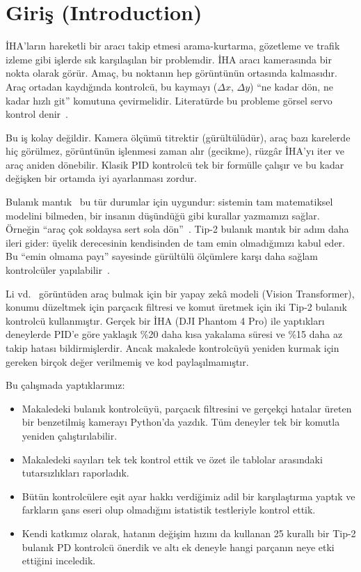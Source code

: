 \documentclass[conference,a4paper]{IEEEtran}
\begin{document}
\section{Giriş (Introduction)}
İHA'ların hareketli bir aracı takip etmesi arama-kurtarma, gözetleme ve trafik izleme gibi işlerde sık karşılaşılan bir problemdir. İHA aracı kamerasında bir nokta olarak görür. Amaç, bu noktanın hep görüntünün ortasında kalmasıdır. Araç ortadan kaydığında kontrolcü, bu kaymayı ($\Delta x$, $\Delta y$) ``ne kadar dön, ne kadar hızlı git'' komutuna çevirmelidir. Literatürde bu probleme görsel servo kontrol denir~\cite{chaumette2006}.

Bu iş kolay değildir. Kamera ölçümü titrektir (gürültülüdür), araç bazı karelerde hiç görülmez, görüntünün işlenmesi zaman alır (gecikme), rüzgâr İHA'yı iter ve araç aniden dönebilir. Klasik PID kontrolcü tek bir formülle çalışır ve bu kadar değişken bir ortamda iyi ayarlanması zordur.

Bulanık mantık~\cite{zadeh1965} bu tür durumlar için uygundur: sistemin tam matematiksel modelini bilmeden, bir insanın düşündüğü gibi kurallar yazmamızı sağlar. Örneğin ``araç çok soldaysa sert sola dön''~\cite{mamdani1975}. Tip-2 bulanık mantık bir adım daha ileri gider: üyelik derecesinin kendisinden de tam emin olmadığımızı kabul eder. Bu ``emin olmama payı'' sayesinde gürültülü ölçümlere karşı daha sağlam kontrolcüler yapılabilir~\cite{karnik1999,mendel2002,wu2012}.

Li vd.~\cite{li2024} görüntüden araç bulmak için bir yapay zekâ modeli (Vision Transformer), konumu düzeltmek için parçacık filtresi ve komut üretmek için iki Tip-2 bulanık kontrolcü kullanmıştır. Gerçek bir İHA (DJI Phantom 4 Pro) ile yaptıkları deneylerde PID'e göre yaklaşık \%20 daha kısa yakalama süresi ve \%15 daha az takip hatası bildirmişlerdir. Ancak makalede kontrolcüyü yeniden kurmak için gereken birçok değer verilmemiş ve kod paylaşılmamıştır.

Bu çalışmada yaptıklarımız:
\begin{itemize}
\item Makaledeki bulanık kontrolcüyü, parçacık filtresini ve gerçekçi hatalar üreten bir benzetilmiş kamerayı Python'da yazdık. Tüm deneyler tek bir komutla yeniden çalıştırılabilir.
\item Makaledeki sayıları tek tek kontrol ettik ve özet ile tablolar arasındaki tutarsızlıkları raporladık.
\item Bütün kontrolcülere eşit ayar hakkı verdiğimiz adil bir karşılaştırma yaptık ve farkların şans eseri olup olmadığını istatistik testleriyle kontrol ettik.
\item Kendi katkımız olarak, hatanın değişim hızını da kullanan 25 kurallı bir Tip-2 bulanık PD kontrolcü önerdik ve altı ek deneyle hangi parçanın neye etki ettiğini inceledik.
\end{itemize}
\end{document}
